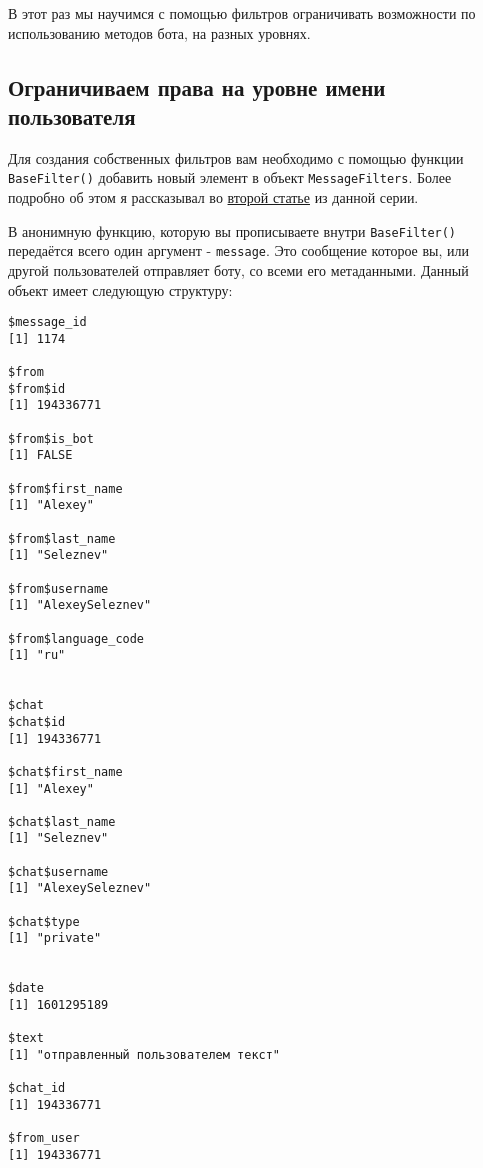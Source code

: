 \documentclass[
]{book}
\begin{document}
В этот раз мы научимся с помощью фильтров ограничивать возможности по использованию методов бота, на разных уровнях.

\hypertarget{ux43eux433ux440ux430ux43dux438ux447ux438ux432ux430ux435ux43c-ux43fux440ux430ux432ux430-ux43dux430-ux443ux440ux43eux432ux43dux435-ux438ux43cux435ux43dux438-ux43fux43eux43bux44cux437ux43eux432ux430ux442ux435ux43bux44f}{%
\subsection{Ограничиваем права на уровне имени пользователя}\label{ux43eux433ux440ux430ux43dux438ux447ux438ux432ux430ux435ux43c-ux43fux440ux430ux432ux430-ux43dux430-ux443ux440ux43eux432ux43dux435-ux438ux43cux435ux43dux438-ux43fux43eux43bux44cux437ux43eux432ux430ux442ux435ux43bux44f}}

Для создания собственных фильтров вам необходимо с помощью функции \texttt{BaseFilter()} добавить новый элемент в объект \texttt{MessageFilters}. Более подробно об этом я рассказывал во \href{https://habr.com/ru/post/515148/}{второй статье} из данной серии.

В анонимную функцию, которую вы прописываете внутри \texttt{BaseFilter()} передаётся всего один аргумент - \texttt{message}. Это сообщение которое вы, или другой пользователей отправляет боту, со всеми его метаданными. Данный объект имеет следующую структуру:

\begin{verbatim}
$message_id
[1] 1174

$from
$from$id
[1] 194336771

$from$is_bot
[1] FALSE

$from$first_name
[1] "Alexey"

$from$last_name
[1] "Seleznev"

$from$username
[1] "AlexeySeleznev"

$from$language_code
[1] "ru"


$chat
$chat$id
[1] 194336771

$chat$first_name
[1] "Alexey"

$chat$last_name
[1] "Seleznev"

$chat$username
[1] "AlexeySeleznev"

$chat$type
[1] "private"


$date
[1] 1601295189

$text
[1] "отправленный пользователем текст"

$chat_id
[1] 194336771

$from_user
[1] 194336771
\end{verbatim}
\end{document}
